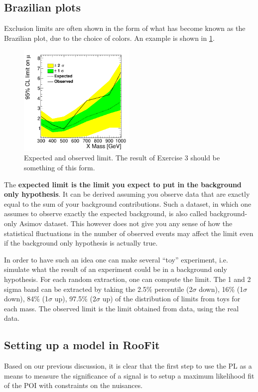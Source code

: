 \documentclass[a4paper,12pt]{article}
\begin{document}
\subsection{Brazilian plots}
Exclusion limits are often shown in the form of what has become known as the
Brazilian plot, due to the choice of colors. An example is shown in
\ref{fig:limit}. 
\begin{figure}[!b]
\centering
\includegraphics[width=0.5\textwidth]{images/limit.png}
\caption{Expected and observed limit. The result of Exercise 3 should be
something of this form.\label{fig:limit}}
\end{figure}

The {\bf expected limit is the limit you expect to put in the background
only hypothesis}. It can be derived assuming you observe data that are exactly
equal to the sum of your background contributions. Such a dataset, in which one
assumes to observe exactly the expected background, is also called
background-only Asimov dataset. 
This however does not give you any sense of how the statistical fluctuations
in the number of observed events may affect the limit even if the background
only hypothesis is actually true. 

In order to have such an idea one can make several
``toy'' experiment, i.e. simulate what the result of an
experiment  could be in a background only hypothesis. For each random
extraction, one can compute the limit. The  1 and 2 sigma band can be
extracted by taking the 2.5\% percentile (2$\sigma$ down), 16\% (1$\sigma$ down), 84\% (1$\sigma$ up), 97.5\%
(2$\sigma$ up) of the distribution of limits from toys for each mass.
The observed limit is the limit obtained from data, using the real data.


\subsection{Setting up a model in RooFit}
Based on our previous discussion, it is clear that the first step to use the
PL as a means to measure the significance of a signal is to setup a maximum
likelihood fit of the POI with constraints on the nuisances.
\end{document}
